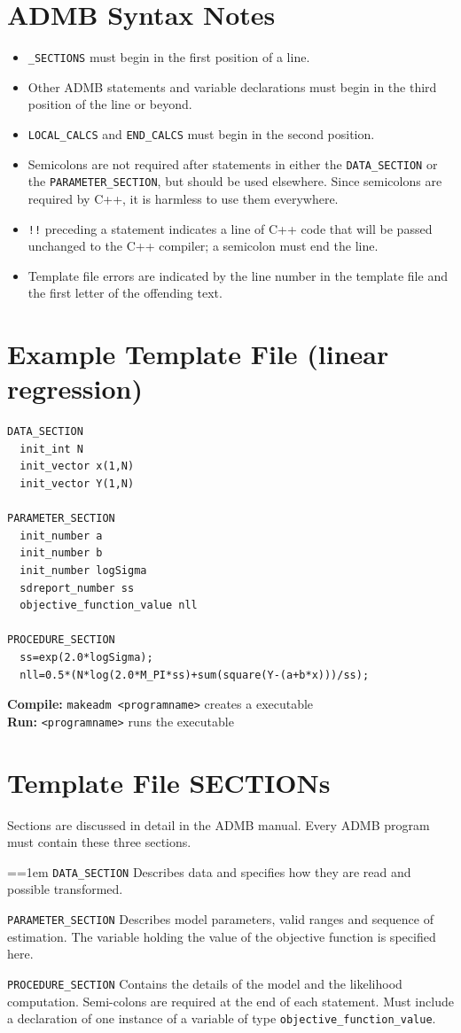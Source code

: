 \section{ADMB Syntax Notes}
\begin{itemize}
\item \verb+_SECTIONS+ must begin in the first position of a line.
\item Other ADMB statements and variable declarations
 must begin in the third position  of the line or beyond.
\item \verb+LOCAL_CALCS+ and \verb+END_CALCS+ 
must begin in the second position.
\item Semicolons are not
required after statements in either the \verb+DATA_SECTION+ or the
\verb+PARAMETER_SECTION+, but should be used elsewhere. Since
semicolons are required by C++, it is harmless to use them
everywhere.
\item \verb+!!+ preceding a statement indicates a line of C++ code
that will be passed unchanged to the C++ compiler; a semicolon must
end the line.
\item Template file errors are indicated by the line number in the template
file and the first letter of the offending text.
\end{itemize}


\section{Example Template File (linear regression)}
\begin{verbatim}
DATA_SECTION
  init_int N
  init_vector x(1,N)
  init_vector Y(1,N)

PARAMETER_SECTION
  init_number a
  init_number b
  init_number logSigma
  sdreport_number ss
  objective_function_value nll

PROCEDURE_SECTION
  ss=exp(2.0*logSigma);
  nll=0.5*(N*log(2.0*M_PI*ss)+sum(square(Y-(a+b*x)))/ss);
\end{verbatim}
{\bf Compile:} \verb|makeadm <programname>| creates a executable \\
{\bf Run:} \verb|<programname>| runs the executable

\section{Template File SECTIONs}
Sections are discussed in detail in the ADMB manual.
Every ADMB program must contain these three sections.

\par{\everypar={\hangindent=1em }
\verb+DATA_SECTION+ Describes data and specifies how they are read 
and possible transformed.

\verb+PARAMETER_SECTION+ Describes model parameters, valid ranges and
sequence of estimation. The variable holding the value of the
objective function is specified here.

\verb+PROCEDURE_SECTION+ Contains the details of the model and the
likelihood computation.  Semi-colons are required at the end of each statement.
Must include a declaration of one instance of a variable of type
\verb|objective_function_value|.

\par}

